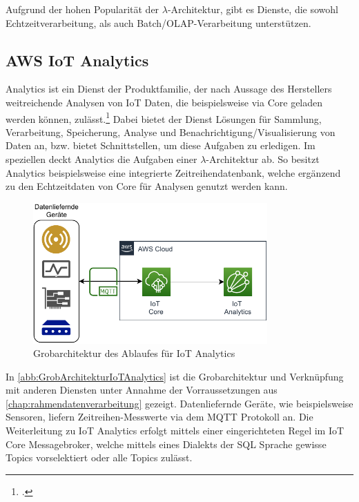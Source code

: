 Aufgrund der hohen Popularität der $\lambda$-Architektur, gibt es Dienste, die sowohl Echtzeitverarbeitung, als auch Batch/\ac{OLAP}-Verarbeitung unterstützen.

\subsection{AWS IoT Analytics} \label{productselection:iotanalytics}



\AWSIOT Analytics ist ein Dienst der \AWSIOT Produktfamilie, der nach Aussage des Herstellers weitreichende Analysen von \ac{IoT} Daten, die beispielsweise via \AWSIOT Core geladen werden können, zulässt.\footcite[Vgl. auch im Folgenden][]{AmazonWebServicesInc..o.J.c} Dabei bietet der Dienst Lösungen für Sammlung, Verarbeitung, Speicherung, Analyse und Benachrichtigung/Visualisierung von Daten an, bzw. bietet Schnittstellen, um diese Aufgaben zu erledigen. Im speziellen deckt \AWSIOT Analytics die Aufgaben einer $\lambda$-Architektur ab. So besitzt \AWSIOT Analytics beispielsweise eine integrierte Zeitreihendatenbank, welche ergänzend zu den Echtzeitdaten von \AWSIOT Core für Analysen genutzt werden kann.
\begin{figure}[H]
\centering
\includegraphics[width=0.8\textwidth]{graphics/IoT-Analytics-general.pdf}
\caption{Grobarchitektur des Ablaufes für IoT Analytics}
\label{abb:GrobArchitekturIoTAnalytics}
\end{figure}
In \autoref{abb:GrobArchitekturIoTAnalytics} ist die Grobarchitektur und Verknüpfung mit anderen Diensten unter Annahme der Vorraussetzungen aus \autoref{chap:rahmendatenverarbeitung} gezeigt. Datenliefernde Geräte, wie beispielsweise Sensoren, liefern Zeitreihen-Messwerte via dem \ac{MQTT} Protokoll an. Die Weiterleitung zu IoT Analytics erfolgt mittels einer eingerichteten Regel im \ac{IoT} Core Messagebroker, welche mittels eines Dialekts der \ac{SQL} Sprache gewisse Topics vorselektiert oder alle Topics zulässt.

